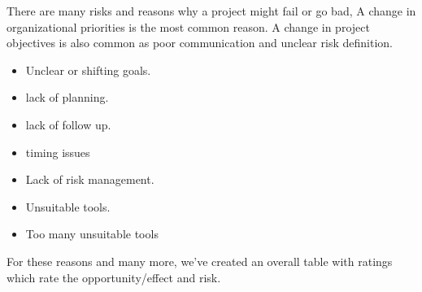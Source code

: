 There are many risks and reasons why a project might fail or go bad, A change in organizational priorities is the most common reason. A change in project objectives is also common as poor communication and unclear risk definition.
	\begin{itemize}
		\setlength\itemsep{-0.3em}
		\item Unclear or shifting goals.
		\item lack of planning.
		\item lack of follow up.
		\item timing issues 
		\item Lack of risk management.
		\item Unsuitable tools.
		\item Too many unsuitable tools
	\end{itemize}

\noindent
For these reasons and many more, we’ve created an overall table with ratings which rate the opportunity/effect and risk.
	
